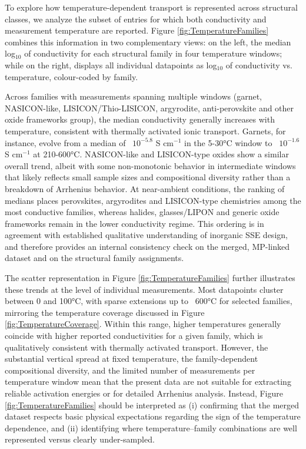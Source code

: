 \documentclass[a4paper,fleqn]{cas-sc}
\begin{document}
To explore how temperature-dependent transport is represented across structural classes, we analyze the subset of entries for which both conductivity and measurement temperature are reported. Figure \ref{fig:TemperatureFamilies} combines this information in two complementary views: on the left, the median log$_{10}$ of conductivity for each structural family in four temperature windows; while on the right, displays all individual datapoints as log$_{10}$ of conductivity vs. temperature, colour-coded by family.

Across families with measurements spanning multiple windows (garnet, NASICON-like, LISICON/Thio-LISICON, argyrodite, anti-perovskite and other oxide frameworks group), the median conductivity generally increases with temperature, consistent with thermally activated ionic transport. Garnets, for instance, evolve from a median of ~$10^{-5.8}$ S cm$^{-1}$ in the 5-30°C window to ~$10^{-1.6}$ S cm$^{-1}$ at 210-600°C. NASICON-like and LISICON-type oxides show a similar overall trend, albeit with some non-monotonic behavior in intermediate windows that likely reflects small sample sizes and compositional diversity rather than a breakdown of Arrhenius behavior. At near-ambient conditions, the ranking of medians places perovskites, argyrodites and LISICON-type chemistries among the most conductive families, whereas halides, glasses/LIPON and generic oxide frameworks remain in the lower conductivity regime. This ordering is in agreement with established qualitative understanding of inorganic SSE design, and therefore provides an internal consistency check on the merged, MP-linked dataset and on the structural family assignments.

The scatter representation in Figure \ref{fig:TemperatureFamilies} further illustrates these trends at the level of individual measurements. Most datapoints cluster between 0 and 100°C, with sparse extensions up to ~600°C for selected families, mirroring the temperature coverage discussed in Figure \ref{fig:TemperatureCoverage}. Within this range, higher temperatures generally coincide with higher reported conductivities for a given family, which is qualitatively consistent with thermally activated transport. However, the substantial vertical spread at fixed temperature, the family-dependent compositional diversity, and the limited number of measurements per temperature window mean that the present data are not suitable for extracting reliable activation energies or for detailed Arrhenius analysis. Instead, Figure \ref{fig:TemperatureFamilies} should be interpreted as (i) confirming that the merged dataset respects basic physical expectations regarding the sign of the temperature dependence, and (ii) identifying where temperature–family combinations are well represented versus clearly under-sampled.
\end{document}
